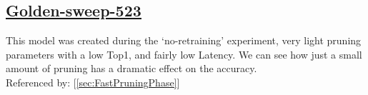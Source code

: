 \documentclass[11pt]{report}
\begin{document}
\subsection*{\protect\href{https://wandb.ai/samfh/Resnet56-Filters-Test/runs/eje5tk6m/overview?workspace=}{\underline{\color{blue}Golden-sweep-523}}}\label{sec:golden-sweep-523}
This model was created during the `no-retraining' experiment, very light pruning parameters with a low Top1, and fairly low Latency. We can see how just a small amount of pruning has a dramatic effect on the accuracy.\\
Referenced by: [\ref{sec:FastPruningPhase}]
\begin{table}[H]
    \centering
    \hspace{2em}
\end{table}


\newpage
\end{document}
